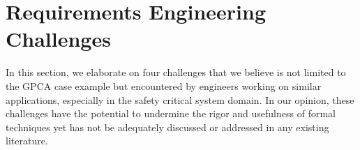 \section{Requirements Engineering Challenges}
\label{sec:challenge}


In this section, we elaborate on four challenges that we believe is not limited to the GPCA case example but encountered by engineers working on similar applications, especially in the safety critical system domain. In our opinion, these challenges have the potential to undermine the rigor and usefulness of formal techniques yet has not be adequately discussed or addressed in any existing literature.


